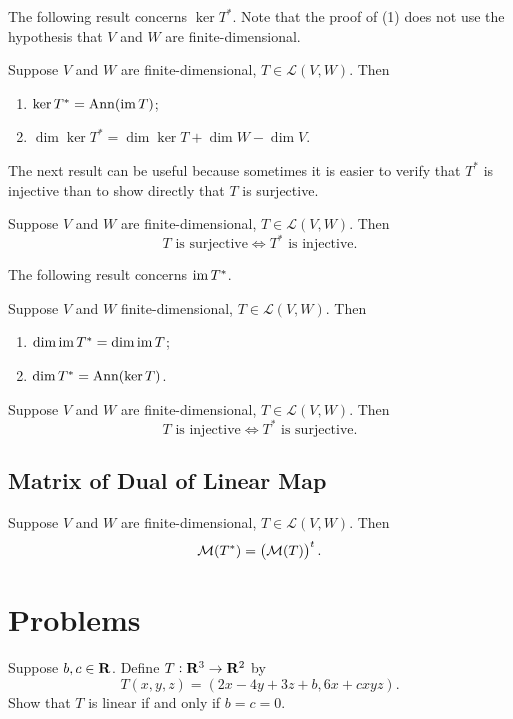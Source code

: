 The following result concerns $\ker T^*$. Note that the proof of (1) does not use the hypothesis that $V$ and $W$ are finite-dimensional.

\begin{proposition}
Suppose $V$ and $W$ are finite-dimensional, $T\in\mathcal{L}(V,W)$. Then
\begin{enumerate}[label=(\roman*)]
\item $\ker T^*=\operatorname{Ann}(\operatorname{im} T)$;
\item $\dim\ker T^*=\dim\ker T+\dim W-\dim V$.
\end{enumerate}
\end{proposition}

The next result can be useful because sometimes it is easier to verify that $T^*$ is injective than to show directly that $T$ is surjective.

\begin{proposition}
Suppose $V$ and $W$ are finite-dimensional, $T\in\mathcal{L}(V,W)$. Then
\[T\text{ is surjective}\iff T^*\text{ is injective.}\]
\end{proposition}

The following result concerns $\operatorname{im} T^*$.

\begin{proposition}
Suppose $V$ and $W$ finite-dimensional, $T\in\mathcal{L}(V,W)$. Then
\begin{enumerate}[label=(\roman*)]
\item $\dim\operatorname{im} T^*=\dim\operatorname{im} T$;
\item $\dim T^*=\operatorname{Ann}(\ker T)$.
\end{enumerate}
\end{proposition}

\begin{proposition}
Suppose $V$ and $W$ are finite-dimensional, $T\in\mathcal{L}(V,W)$. Then
\[T\text{ is injective}\iff T^*\text{ is surjective.}\]
\end{proposition}

\subsection{Matrix of Dual of Linear Map}
\begin{proposition}
Suppose $V$ and $W$ are finite-dimensional, $T\in\mathcal{L}(V,W)$. Then
\[\mathcal{M}(T^*)=\left(\mathcal{M}(T)\right)^t.\]
\end{proposition}


\pagebreak

\section*{Problems}
\begin{prbm}
Suppose $b,c\in\mathbf R$. Define $T:\mathbf R^3\to\mathbf R^2$ by
\[T(x,y,z)=(2x-4y+3z+b,6x+cxyz).\]
Show that $T$ is linear if and only if $b=c=0$.
\end{prbm}

